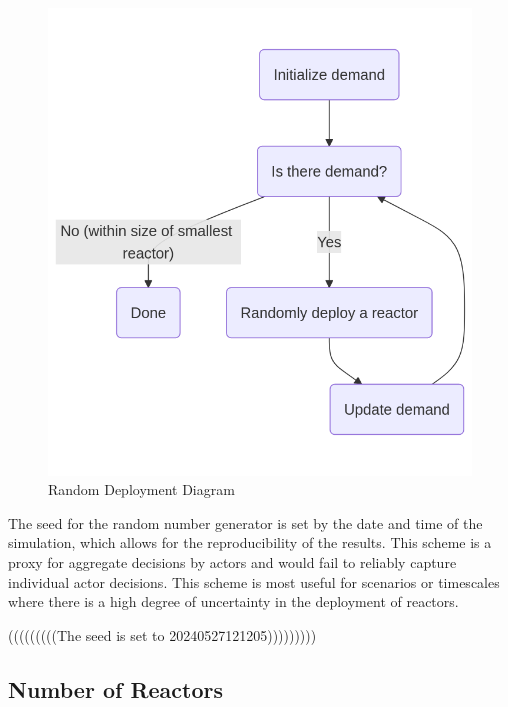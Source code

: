 \begin{figure}[H]
    \centering
    \includegraphics[scale=0.4]{images/schemes/random_diagram.png}
    \caption{Random Deployment Diagram}
    \label{fig:random_diagram}
\end{figure}

The seed for the random number generator is set by the date and time of the
simulation, which allows for the reproducibility of the results. This scheme is
a proxy for aggregate decisions by actors and would fail to reliably capture
individual actor decisions. This scheme is most useful for scenarios or
timescales where there is a high degree of uncertainty in the deployment of
reactors.

(((((((((The seed is set to 20240527121205)))))))))


\subsection{Number of Reactors}


